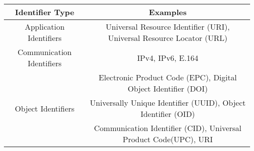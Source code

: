 \documentclass{standalone}
\begin{document}
\begin{tabular}{ | c | c |}
       \hline
       Identifier Type  &  Examples  \\
       \hline
       Application Identifiers  &  Universal Resource Identifier (URI), Universal Resource Locator (URL) \\
       \hline
       Communication Identifiers & IPv4, IPv6, E.164 \\
       \hline
       \multirow{3}{*}{Object Identifiers} &  Electronic Product Code (EPC), Digital Object Identifier (DOI)\\
                                           &  Universally Unique Identifier (UUID),  Object Identifier (OID)\\
                                           &  Communication Identifier (CID), Universal Product Code(UPC), URI\\
       \hline
\end{tabular}
 
\end{document}
